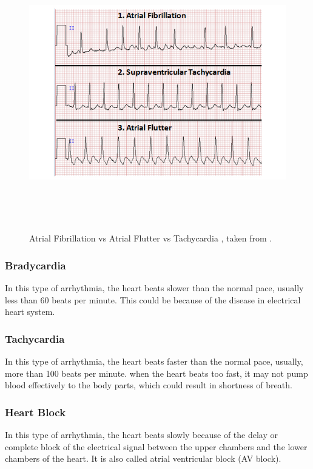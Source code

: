 \begin{figure}[htpb]
	\centering
	\includegraphics[width=15cm,height=12cm,keepaspectratio=true]{images/af}
	\caption{
		Atrial Fibrillation vs Atrial Flutter vs Tachycardia , taken from \cite{sumdu}.
	}
	\label{fig:af}
\end{figure}


\subsubsection{Bradycardia}
In this type of arrhythmia, the heart beats slower than the normal pace, usually less than 60 beats per minute. This could be because of the disease in electrical heart system.

\subsubsection{Tachycardia}
In this type of arrhythmia, the heart beats faster than the normal pace, usually, more than 100 beats per minute. when the heart beats too fast, it may not pump blood effectively to the body parts, which could result in shortness of breath.

\subsubsection{Heart Block}
In this type of arrhythmia, the heart beats slowly because of the delay or complete block of the electrical signal between the upper chambers and the lower chambers of the heart. It is also called atrial ventricular block (AV block).

